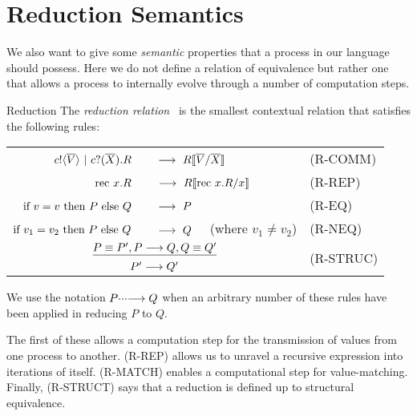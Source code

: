 \section{Reduction Semantics}\label{secreducationsemantics}
We also want to give some \emph{semantic} properties that a process in our language should possess.  Here we do not define a relation of equivalence but rather one that allows a process to internally evolve through a number of computation steps.
\begin{definition}{Reduction}
	The \emph{reduction relation} \pred\ is the smallest contextual relation that satisfies the following rules:
	\begin{center}\begin{tabular}{rll}
		${c}!\langle{ \ensuremath{\overline{V}} }\rangle \ |\  {c}?({\overline{X}}).R$\ &\  $\longrightarrow\  R\llbracket{ \ensuremath{\overline{V}} }/{\overline{X}}\rrbracket$ & \tiny{(R-COMM)}\\
		$\text{rec }{x}.R$\ &\  $\longrightarrow\  R\llbracket{ \ensuremath{\text{rec }{x}.} R}/{x}\rrbracket$ & \tiny{(R-REP)}\\
		$\text{if } {v = v}\text{ then } P \text{ else } Q$\ &\ $\pred\ P$ & \tiny{(R-EQ)}\\
		$\text{if } {v_1 = v_2}\text{ then } P \text{ else } Q$\ &\ $\pred\ Q$ \ \ (where $v_1\neq v_2$)& \tiny{(R-NEQ)}\\
		\multicolumn{2}{c}{\hspace{4.5em}$\underline{P\equiv P', P \longrightarrow Q, Q\equiv Q'}$} & \multirow{2}{*}{\tiny{(R-STRUC)}}\\
		\multicolumn{2}{c}{\hspace{4.5em}$P'\longrightarrow Q'$}
	\end{tabular}\end{center}
	We use the notation $P\cdotp\!\cdotp\!\cdotp\!\longrightarrow Q$ when an arbitrary number of these rules have been applied in reducing $P$ to $Q$.
\end{definition}
The first of these allows a computation step for the transmission of values from one process to another.  (R-REP)  allows us to unravel a recursive expression into iterations of itself.  (R-MATCH) enables a computational step for value-matching.  Finally, (R-STRUCT) says that a reduction is defined up to structural equivalence.
